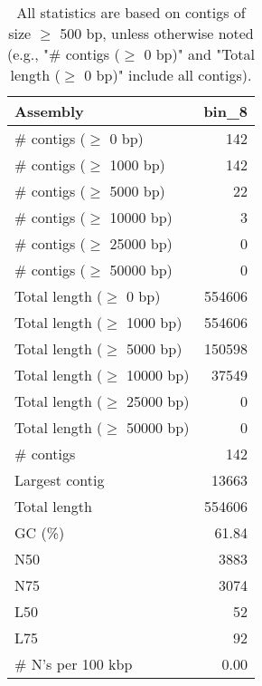 \documentclass[12pt,a4paper]{article}
\begin{document}
\begin{table}[ht]
\begin{center}
\caption{All statistics are based on contigs of size $\geq$ 500 bp, unless otherwise noted (e.g., "\# contigs ($\geq$ 0 bp)" and "Total length ($\geq$ 0 bp)" include all contigs).}
\begin{tabular}{|l*{1}{|r}|}
\hline
Assembly & bin\_8 \\ \hline
\# contigs ($\geq$ 0 bp) & 142 \\ \hline
\# contigs ($\geq$ 1000 bp) & 142 \\ \hline
\# contigs ($\geq$ 5000 bp) & 22 \\ \hline
\# contigs ($\geq$ 10000 bp) & 3 \\ \hline
\# contigs ($\geq$ 25000 bp) & 0 \\ \hline
\# contigs ($\geq$ 50000 bp) & 0 \\ \hline
Total length ($\geq$ 0 bp) & 554606 \\ \hline
Total length ($\geq$ 1000 bp) & 554606 \\ \hline
Total length ($\geq$ 5000 bp) & 150598 \\ \hline
Total length ($\geq$ 10000 bp) & 37549 \\ \hline
Total length ($\geq$ 25000 bp) & 0 \\ \hline
Total length ($\geq$ 50000 bp) & 0 \\ \hline
\# contigs & 142 \\ \hline
Largest contig & 13663 \\ \hline
Total length & 554606 \\ \hline
GC (\%) & 61.84 \\ \hline
N50 & 3883 \\ \hline
N75 & 3074 \\ \hline
L50 & 52 \\ \hline
L75 & 92 \\ \hline
\# N's per 100 kbp & 0.00 \\ \hline
\end{tabular}
\end{center}
\end{table}
\end{document}
